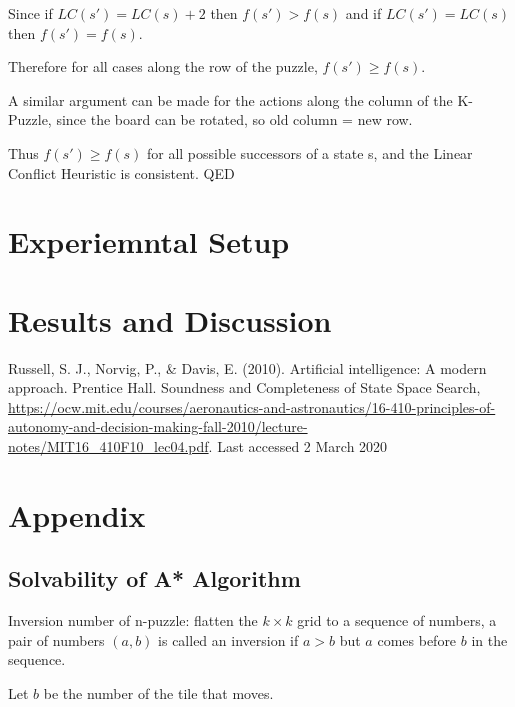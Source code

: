\documentclass{llncs}
\begin{document}
Since if $LC(s') = LC(s) + 2$ then $f(s') > f(s)$ and if $LC(s') = LC(s)$ then $f(s') = f(s)$.

Therefore for all cases along the row of the puzzle, $f(s') \geq f(s)$. 

A similar argument can be made for the actions along the column of the K-Puzzle, since the board can be rotated, so old column = new row.

Thus $f(s') \geq f(s)$ for all possible successors of a state s, and the Linear Conflict Heuristic is consistent. QED

\section{Experiemntal Setup}
\section{Results and Discussion}
\newpage

\begin{thebibliography}{8}
Russell, S. J., Norvig, P., \& Davis, E. (2010). Artificial intelligence: A modern approach. Prentice Hall.
Soundness and Completeness of State Space Search, \url{https://ocw.mit.edu/courses/aeronautics-and-astronautics/16-410-principles-of-autonomy-and-decision-making-fall-2010/lecture-notes/MIT16\_410F10\_lec04.pdf}. Last accessed 2 March 2020
\end{thebibliography}
\newpage
\section{Appendix}
\subsection{Solvability of A* Algorithm}
\begin{definition}
Inversion number of n-puzzle: flatten the $k \times k$ grid to a sequence of numbers, a pair of numbers $(a,b)$ is called an inversion if $a>b$ but $a$ comes before $b$ in the sequence.
\end{definition}
Let $b$ be the number of the tile that moves.
\end{document}
